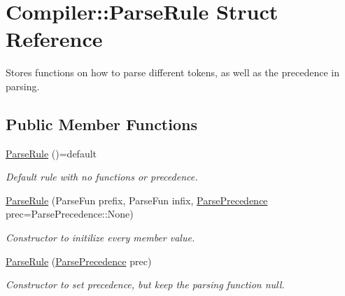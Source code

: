 \hypertarget{struct_compiler_1_1_parse_rule}{}\section{Compiler\+:\+:Parse\+Rule Struct Reference}
\label{struct_compiler_1_1_parse_rule}


Stores functions on how to parse different tokens, as well as the precedence in parsing.  


\subsection*{Public Member Functions}
\begin{DoxyCompactItemize}
\item 
\mbox{\label{struct_compiler_1_1_parse_rule_abc47f09a78a44bac1c12df17a9b80a6c}} 
\hyperlink{struct_compiler_1_1_parse_rule_abc47f09a78a44bac1c12df17a9b80a6c}{Parse\+Rule} ()=default
\begin{DoxyCompactList}\small\item\em Default rule with no functions or precedence. \end{DoxyCompactList}\item 
\mbox{\label{struct_compiler_1_1_parse_rule_aee067373e96457c20426878dfc443d75}} 
\hyperlink{struct_compiler_1_1_parse_rule_aee067373e96457c20426878dfc443d75}{Parse\+Rule} (Parse\+Fun prefix, Parse\+Fun infix, \hyperlink{_compiler_8h_a916d5c37341c55c25b123d8c78439562}{Parse\+Precedence} prec=Parse\+Precedence\+::\+None)
\begin{DoxyCompactList}\small\item\em Constructor to initilize every member value. \end{DoxyCompactList}\item 
\mbox{\label{struct_compiler_1_1_parse_rule_a846b531b5cdebcc937d4fec93261f195}} 
\hyperlink{struct_compiler_1_1_parse_rule_a846b531b5cdebcc937d4fec93261f195}{Parse\+Rule} (\hyperlink{_compiler_8h_a916d5c37341c55c25b123d8c78439562}{Parse\+Precedence} prec)
\begin{DoxyCompactList}\small\item\em Constructor to set precedence, but keep the parsing function null. \end{DoxyCompactList}\end{DoxyCompactItemize}
